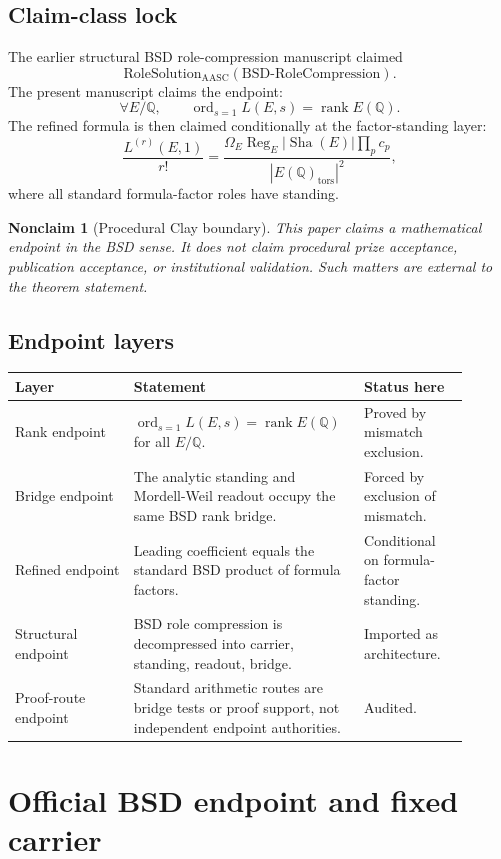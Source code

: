 \documentclass[11pt]{article}
\newtheorem{nonclaim}[theorem]{Nonclaim}
\newcommand{\Q}{\mathbb{Q}}
\newcommand{\Sha}{\operatorname{Sha}}
\newcommand{\rank}{\operatorname{rank}}
\newcommand{\ord}{\operatorname{ord}}
\newcommand{\Reg}{\operatorname{Reg}}
\newcommand{\tors}{\operatorname{tors}}
\newcommand{\BSD}{\mathrm{BSD}}
\newcommand{\AASC}{\mathrm{AASC}}
\begin{document}
\subsection{Claim-class lock}
The earlier structural BSD role-compression manuscript claimed
\[
\mathrm{RoleSolution}_{\AASC}(\BSD\text{-}\mathrm{RoleCompression}).
\]
The present manuscript claims the endpoint:
\[
\forall E/\Q,\qquad \ord_{s=1}L(E,s)=\rank E(\Q).
\]
The refined formula is then claimed conditionally at the factor-standing layer:
\[
\frac{L^{(r)}(E,1)}{r!}
=
\frac{\Omega_E\Reg_E |\Sha(E)|\prod_p c_p}{|E(\Q)_{\tors}|^2},
\]
where all standard formula-factor roles have standing.

\begin{nonclaim}[Procedural Clay boundary]
This paper claims a mathematical endpoint in the BSD sense. It does not claim procedural prize acceptance, publication acceptance, or institutional validation. Such matters are external to the theorem statement.
\end{nonclaim}

\subsection{Endpoint layers}
\begin{longtable}{L{0.25\linewidth}L{0.43\linewidth}L{0.22\linewidth}}
\toprule
\textbf{Layer} & \textbf{Statement} & \textbf{Status here}\\
\midrule
Rank endpoint & $\ord_{s=1}L(E,s)=\rank E(\Q)$ for all $E/\Q$. & Proved by mismatch exclusion.\\
Bridge endpoint & The analytic standing and Mordell-Weil readout occupy the same BSD rank bridge. & Forced by exclusion of mismatch.\\
Refined endpoint & Leading coefficient equals the standard BSD product of formula factors. & Conditional on formula-factor standing.\\
Structural endpoint & BSD role compression is decompressed into carrier, standing, readout, bridge. & Imported as architecture.\\
Proof-route endpoint & Standard arithmetic routes are bridge tests or proof support, not independent endpoint authorities. & Audited.\\
\bottomrule
\end{longtable}

\section{Official BSD endpoint and fixed carrier}
\end{document}
